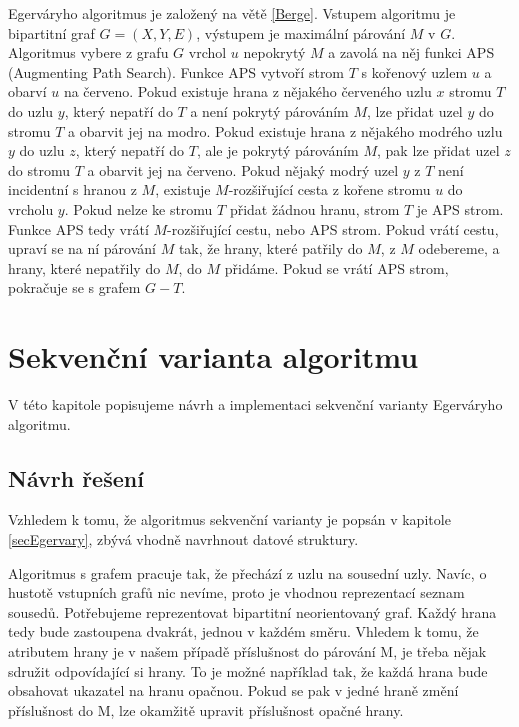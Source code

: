 \documentclass[a4paper, 11pt, titlepage, final]{article}[3. prosinec 2011]
\begin{document}
Egerváryho algoritmus je založený na větě \ref{Berge}. Vstupem algoritmu je bipartitní graf $G=(X,Y,E)$, výstupem je maximální párování $M$ v $G$. Algoritmus vybere z grafu $G$ vrchol $u$ nepokrytý $M$ a zavolá na něj funkci APS (Augmenting Path Search). Funkce APS vytvoří strom $T$ s kořenový uzlem $u$ a obarví $u$ na červeno. Pokud existuje hrana z nějakého červeného uzlu $x$ stromu $T$ do uzlu $y$, který nepatří do $T$ a není pokrytý párováním $M$, lze přidat uzel $y$ do stromu $T$ a obarvit jej na modro. Pokud existuje hrana z nějakého modrého uzlu $y$ do uzlu $z$, který nepatří do $T$, ale je pokrytý párováním $M$, pak lze přidat uzel $z$ do stromu $T$ a obarvit jej na červeno. Pokud nějaký modrý uzel $y$ z $T$ není incidentní s hranou z $M$, existuje $M$-rozšiřující cesta z kořene stromu $u$ do vrcholu $y$. Pokud nelze ke stromu $T$ přidat žádnou hranu, strom $T$ je APS strom. Funkce APS tedy vrátí $M$-rozšiřující cestu, nebo APS strom. Pokud vrátí cestu, upraví se na ní párování $M$ tak, že hrany, které patřily do $M$, z $M$ odebereme, a hrany, které nepatřily do $M$, do $M$ přidáme. Pokud se vrátí APS strom, pokračuje se s grafem $G-T$.  

\section{Sekvenční varianta algoritmu} \label{secSeq}

V této kapitole popisujeme návrh a implementaci sekvenční varianty Egerváryho algoritmu.

\subsection{Návrh řešení}

Vzhledem k tomu, že algoritmus sekvenční varianty je popsán v kapitole \ref{secEgervary}, zbývá vhodně navrhnout datové struktury. 

Algoritmus s grafem pracuje tak, že přechází z uzlu na sousední uzly. Navíc, o hustotě vstupních grafů nic nevíme, proto je vhodnou reprezentací seznam sousedů. Potřebujeme reprezentovat bipartitní neorientovaný graf. Každý hrana tedy bude zastoupena dvakrát, jednou v každém směru. Vhledem k tomu, že atributem hrany je v našem případě příslušnost do párování M, je třeba nějak sdružit odpovídající si hrany. To je možné například tak, že každá hrana bude obsahovat ukazatel na hranu opačnou. Pokud se pak v jedné hraně změní příslušnost do M, lze okamžitě upravit příslušnost opačné hrany.
\end{document}
